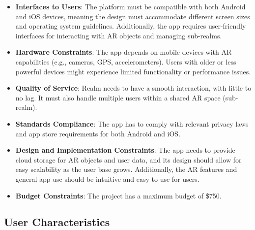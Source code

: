 \documentclass{article}
\begin{document}
\begin{itemize}
    \item \textbf{Interfaces to Users}: The platform must be compatible with both Android and iOS devices, meaning the design must accommodate different screen sizes and operating system guidelines. Additionally, the app requires user-friendly interfaces for interacting with AR objects and managing sub-realms.

    \item \textbf{Hardware Constraints}: The app depends on mobile devices with AR capabilities (e.g., cameras, GPS, accelerometers). Users with older or less powerful devices might experience limited functionality or performance issues.

    \item \textbf{Quality of Service}: Realm needs to have a smooth interaction, with little to no lag. It must also handle multiple users within a shared AR space (sub-realm).

    \item \textbf{Standards Compliance}: The app has to comply with relevant privacy laws and app store requirements for both Android and iOS.

    \item \textbf{Design and Implementation Constraints}: The app needs to provide cloud storage for AR objects and user data, and its design should allow for easy scalability as the user base grows. Additionally, the AR features and general app use should be intuitive and easy to use for users.

    \item \textbf{Budget Constraints}: The project has a maximum budget of \$750.
\end{itemize}

\subsection{User Characteristics}

\end{document}
